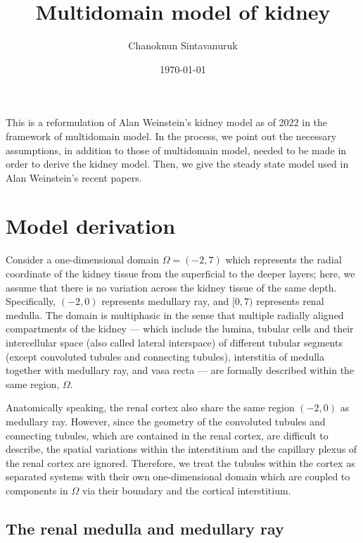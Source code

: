 \documentclass{article}
\title{Multidomain model of kidney}
\author[1]{Chanoknun Sintavanuruk}
\date{\today}
\begin{document}
\sloppy %
\maketitle

This is a reformulation of Alan Weinstein's kidney model as of 2022 in the framework of multidomain model.
In the process, we point out the necessary assumptions, in addition to those of multidomain model, needed to be made in order to derive the kidney model.
Then, we give the steady state model used in Alan Weinstein's recent papers.

\section{Model derivation}

Consider a one-dimensional domain $\Omega = (-2,7)$ which represents the radial coordinate of the kidney tissue from the superficial to the deeper layers; here, we assume that there is no variation across the kidney tissue of the same depth.
Specifically, $(-2,0)$ represents medullary ray, and $[0,7)$ represents renal medulla.
The domain is multiphasic in the sense that multiple radially aligned compartments of the kidney --- which include the lumina, tubular cells and their intercellular space (also called lateral interspace) of different tubular segments (except convoluted tubules and connecting tubules), interstitia of medulla together with medullary ray, and vasa recta --- are formally described within the same region, $\Omega$.

Anatomically speaking, the renal cortex also share the same region $(-2,0)$ as medullary ray.
However, since the geometry of the convoluted tubules and connecting tubules, which are contained in the renal cortex, are difficult to describe, the spatial variations within the interstitium and the capillary plexus of the renal cortex are ignored.
Therefore, we treat the tubules within the cortex as separated systems with their own one-dimensional domain which are coupled to components in $\Omega$ via their boundary and the cortical interstitium.

\subsection{The renal medulla and medullary ray}
\end{document}
